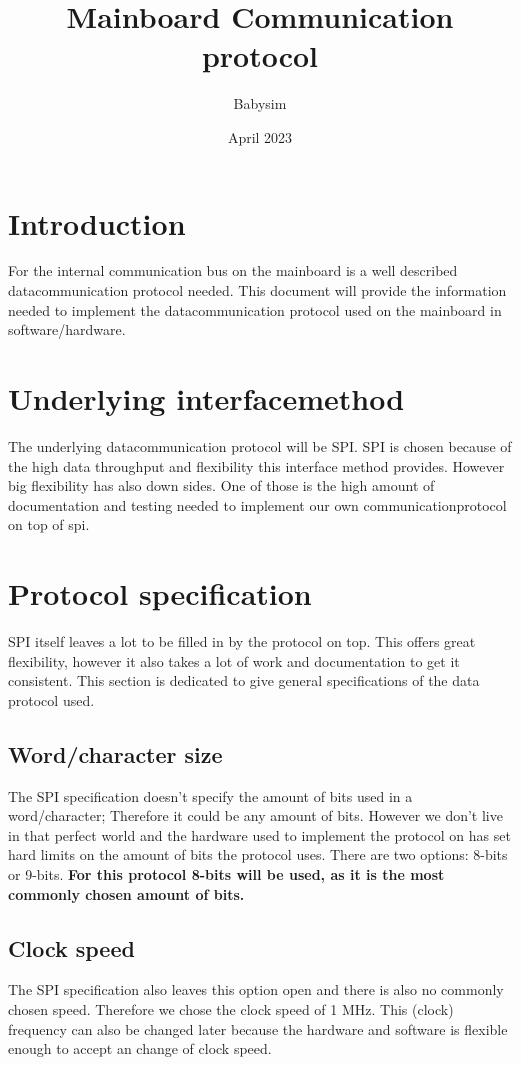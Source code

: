 \documentclass{article}
\title{Mainboard Communication protocol}
\author{Babysim}
\date{April 2023}
\begin{document}
\maketitle
\pagebreak
\section{Introduction}
For the internal communication bus on the mainboard is a well described datacommunication protocol needed. This document will provide the information needed to implement the datacommunication protocol used on the mainboard in software/hardware.

\section{Underlying interfacemethod}
The underlying datacommunication protocol will be SPI. SPI is chosen because of the high data throughput and flexibility this interface method provides. However big flexibility has also down sides. One of those is the high amount of documentation and testing needed to implement our own communicationprotocol on top of spi. \\
\pagebreak
\section{Protocol specification}
SPI itself leaves a lot to be filled in by the protocol on top. This offers great flexibility, however it also takes a lot of work and documentation to get it consistent. This section is dedicated to give general specifications of the data protocol used.
\subsection{Word/character size}
The SPI specification doesn't specify the amount of bits used in a word/character; Therefore it could be any amount of bits. However we don't live in that perfect world and the hardware used to implement the protocol on has set hard limits on the amount of bits the protocol uses.
There are two options: 8-bits or 9-bits. \textbf{For this protocol 8-bits will be used, as it is the most commonly chosen amount of bits. }
\subsection{Clock speed}
The SPI specification also leaves this option open and there is also no commonly chosen speed. Therefore we chose the clock speed of 1 MHz. This (clock) frequency can also be changed later because the hardware and software is flexible enough to accept an change of clock speed.
\end{document}

